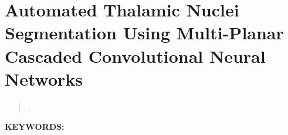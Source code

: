 \renewcommand{\figurepath}[1]{Chapters/thalamus/figures/#1}

\chapter{Automated Thalamic Nuclei Segmentation Using Multi-Planar Cascaded Convolutional Neural Networks}\label{ch:thalamus}

\begin{quotation}
    \centering
    .
\end{quotation}


%

\textbf{KEYWORDS:\ } %

\newpage

% 
